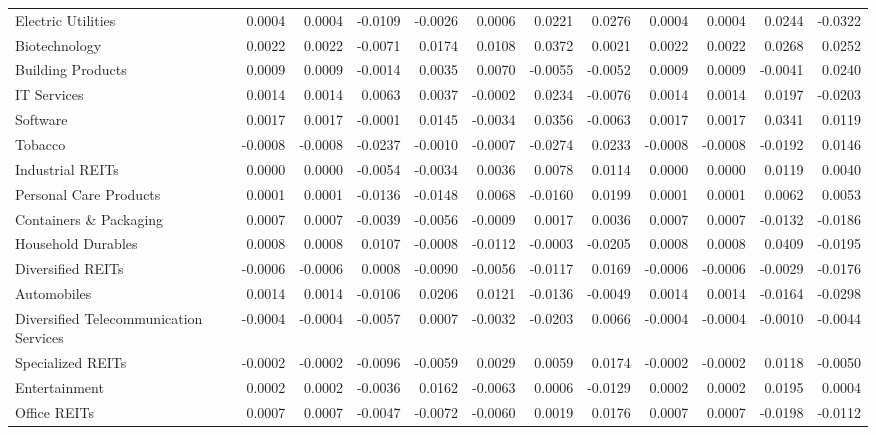 \begin{table}
\begin{tabular}{lrrrrrrrrrrr}
Electric Utilities & 0.0004 & 0.0004 & -0.0109 & -0.0026 & 0.0006 & 0.0221 & 0.0276 & 0.0004 & 0.0004 & 0.0244 & -0.0322 \\
Biotechnology & 0.0022 & 0.0022 & -0.0071 & 0.0174 & 0.0108 & 0.0372 & 0.0021 & 0.0022 & 0.0022 & 0.0268 & 0.0252 \\
Building Products & 0.0009 & 0.0009 & -0.0014 & 0.0035 & 0.0070 & -0.0055 & -0.0052 & 0.0009 & 0.0009 & -0.0041 & 0.0240 \\
IT Services & 0.0014 & 0.0014 & 0.0063 & 0.0037 & -0.0002 & 0.0234 & -0.0076 & 0.0014 & 0.0014 & 0.0197 & -0.0203 \\
Software & 0.0017 & 0.0017 & -0.0001 & 0.0145 & -0.0034 & 0.0356 & -0.0063 & 0.0017 & 0.0017 & 0.0341 & 0.0119 \\
Tobacco & -0.0008 & -0.0008 & -0.0237 & -0.0010 & -0.0007 & -0.0274 & 0.0233 & -0.0008 & -0.0008 & -0.0192 & 0.0146 \\
Industrial REITs & 0.0000 & 0.0000 & -0.0054 & -0.0034 & 0.0036 & 0.0078 & 0.0114 & 0.0000 & 0.0000 & 0.0119 & 0.0040 \\
Personal Care Products & 0.0001 & 0.0001 & -0.0136 & -0.0148 & 0.0068 & -0.0160 & 0.0199 & 0.0001 & 0.0001 & 0.0062 & 0.0053 \\
Containers \& Packaging & 0.0007 & 0.0007 & -0.0039 & -0.0056 & -0.0009 & 0.0017 & 0.0036 & 0.0007 & 0.0007 & -0.0132 & -0.0186 \\
Household Durables & 0.0008 & 0.0008 & 0.0107 & -0.0008 & -0.0112 & -0.0003 & -0.0205 & 0.0008 & 0.0008 & 0.0409 & -0.0195 \\
Diversified REITs & -0.0006 & -0.0006 & 0.0008 & -0.0090 & -0.0056 & -0.0117 & 0.0169 & -0.0006 & -0.0006 & -0.0029 & -0.0176 \\
Automobiles & 0.0014 & 0.0014 & -0.0106 & 0.0206 & 0.0121 & -0.0136 & -0.0049 & 0.0014 & 0.0014 & -0.0164 & -0.0298 \\
Diversified Telecommunication Services & -0.0004 & -0.0004 & -0.0057 & 0.0007 & -0.0032 & -0.0203 & 0.0066 & -0.0004 & -0.0004 & -0.0010 & -0.0044 \\
Specialized REITs & -0.0002 & -0.0002 & -0.0096 & -0.0059 & 0.0029 & 0.0059 & 0.0174 & -0.0002 & -0.0002 & 0.0118 & -0.0050 \\
Entertainment & 0.0002 & 0.0002 & -0.0036 & 0.0162 & -0.0063 & 0.0006 & -0.0129 & 0.0002 & 0.0002 & 0.0195 & 0.0004 \\
Office REITs & 0.0007 & 0.0007 & -0.0047 & -0.0072 & -0.0060 & 0.0019 & 0.0176 & 0.0007 & 0.0007 & -0.0198 & -0.0112 \\

\end{tabular}
\end{table}

